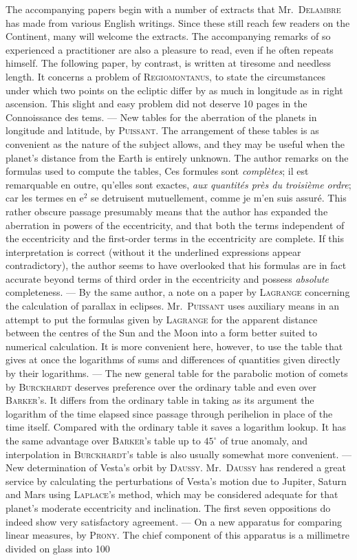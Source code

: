 The accompanying papers begin with a number of extracts that Mr.\ \textsc{Delambre} has made from various English writings. Since these still reach few readers on the Continent, many will welcome the extracts. The accompanying remarks of so experienced a practitioner are also a pleasure to read, even if he often repeats himself. The following paper, by contrast, is written at tiresome and needless length. It concerns a problem of \textsc{Regiomontanus}, to state the circumstances under which two points on the ecliptic differ by as much in longitude as in right ascension. This slight and easy problem did not deserve 10 pages in the Connoissance des tems. --- New tables for the aberration of the planets in longitude and latitude, by \textsc{Puissant}. The arrangement of these tables is as convenient as the nature of the subject allows, and they may be useful when the planet’s distance from the Earth is entirely unknown. The author remarks on the formulas used to compute the tables, Ces formules sont \emph{complètes}; il est remarquable en outre, qu'elles sont exactes, \emph{aux quantités près du troisième ordre}; car les termes en $\mathrm{e}^2$ se detruisent mutuellement, comme je m'en suis assuré. This rather obscure passage presumably means that the author has expanded the aberration in powers of the eccentricity, and that both the terms independent of the eccentricity and the first-order terms in the eccentricity are complete. If this interpretation is correct (without it the underlined expressions appear contradictory), the author seems to have overlooked that his formulas are in fact accurate beyond terms of third order in the eccentricity and possess \emph{absolute} completeness. --- By the same author, a note on a paper by \textsc{Lagrange} concerning the calculation of parallax in eclipses. Mr.\ \textsc{Puissant} uses auxiliary means in an attempt to put the formulas given by \textsc{Lagrange} for the apparent distance between the centres of the Sun and the Moon into a form better suited to numerical calculation. It is more convenient here, however, to use the table that gives at once the logarithms of sums and differences of quantities given directly by their logarithms. --- The new general table for the parabolic motion of comets by \textsc{Burckhardt} deserves preference over the ordinary table and even over \textsc{Barker}’s. It differs from the ordinary table in taking as its argument the logarithm of the time elapsed since passage through perihelion in place of the time itself. Compared with the ordinary table it saves a logarithm lookup. It has the same advantage over \textsc{Barker}’s table up to $45^\circ$ of true anomaly, and interpolation in \textsc{Burckhardt}’s table is also usually somewhat more convenient. --- New determination of Vesta’s orbit by \textsc{Daussy}. Mr.\ \textsc{Daussy} has rendered a great service by calculating the perturbations of Vesta’s motion due to Jupiter, Saturn and Mars using \textsc{Laplace}’s method, which may be considered adequate for that planet’s moderate eccentricity and inclination. The first seven oppositions do indeed show very satisfactory agreement. --- On a new apparatus for comparing linear measures, by \textsc{Prony}. The chief component of this apparatus is a millimetre divided on glass into 100 